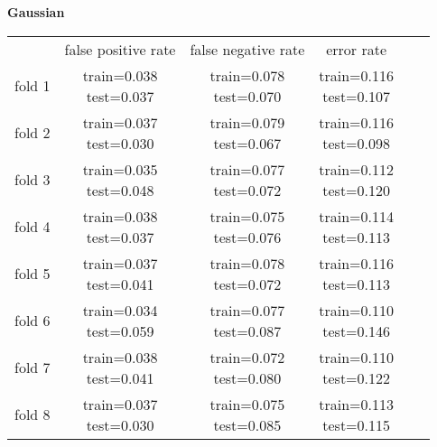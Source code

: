 \documentclass[12pt]{article}
\begin{document}
\clearpage
\textbf{Gaussian} \\
\begin{tabular}{ r|c|c|c|c|c| } \multicolumn{1}{r}{}
& \multicolumn{1}{c}{false positive rate}
& \multicolumn{1}{c}{false negative rate}
& \multicolumn{1}{c}{error rate} \\
\cline{2-4}
fold 1 & \shortstack{train=0.038 \\ test=0.037}& \shortstack{train=0.078 \\ test=0.070}& \shortstack{train=0.116 \\ test=0.107} \\\cline{2-4}
fold 2 & \shortstack{train=0.037 \\ test=0.030}& \shortstack{train=0.079 \\ test=0.067}& \shortstack{train=0.116 \\ test=0.098} \\\cline{2-4}
fold 3 & \shortstack{train=0.035 \\ test=0.048}& \shortstack{train=0.077 \\ test=0.072}& \shortstack{train=0.112 \\ test=0.120} \\\cline{2-4}
fold 4 & \shortstack{train=0.038 \\ test=0.037}& \shortstack{train=0.075 \\ test=0.076}& \shortstack{train=0.114 \\ test=0.113} \\\cline{2-4}
fold 5 & \shortstack{train=0.037 \\ test=0.041}& \shortstack{train=0.078 \\ test=0.072}& \shortstack{train=0.116 \\ test=0.113} \\\cline{2-4}
fold 6 & \shortstack{train=0.034 \\ test=0.059}& \shortstack{train=0.077 \\ test=0.087}& \shortstack{train=0.110 \\ test=0.146} \\\cline{2-4}
fold 7 & \shortstack{train=0.038 \\ test=0.041}& \shortstack{train=0.072 \\ test=0.080}& \shortstack{train=0.110 \\ test=0.122} \\\cline{2-4}
fold 8 & \shortstack{train=0.037 \\ test=0.030}& \shortstack{train=0.075 \\ test=0.085}& \shortstack{train=0.113 \\ test=0.115} \\\cline{2-4}

\end{tabular}
\end{document}
